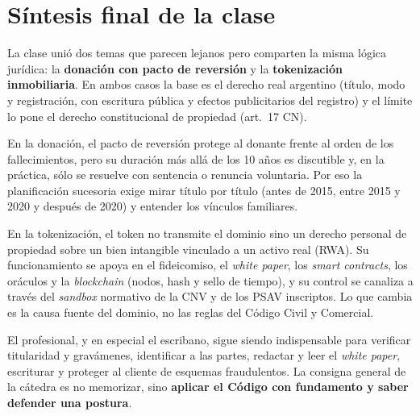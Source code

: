 \documentclass[12pt,oneside]{book}
\begin{document}
\chapter[Síntesis final]{Síntesis final de la clase}

La clase unió dos temas que parecen lejanos pero comparten la misma lógica jurídica: la \textbf{donación con pacto de reversión} y la \textbf{tokenización inmobiliaria}. En ambos casos la base es el derecho real argentino (título, modo y registración, con escritura pública y efectos publicitarios del registro) y el límite lo pone el derecho constitucional de propiedad (art.~17 CN).

En la donación, el pacto de reversión protege al donante frente al orden de los fallecimientos, pero su duración más allá de los 10 años es discutible y, en la práctica, sólo se resuelve con sentencia o renuncia voluntaria. Por eso la planificación sucesoria exige mirar título por título (antes de 2015, entre 2015 y 2020 y después de 2020) y entender los vínculos familiares.

En la tokenización, el token no transmite el dominio sino un derecho personal de propiedad sobre un bien intangible vinculado a un activo real (RWA). Su funcionamiento se apoya en el fideicomiso, el \textit{white paper}, los \textit{smart contracts}, los oráculos y la \textit{blockchain} (nodos, hash y sello de tiempo), y su control se canaliza a través del \textit{sandbox} normativo de la CNV y de los PSAV inscriptos. Lo que cambia es la causa fuente del dominio, no las reglas del Código Civil y Comercial.

El profesional, y en especial el escribano, sigue siendo indispensable para verificar titularidad y gravámenes, identificar a las partes, redactar y leer el \textit{white paper}, escriturar y proteger al cliente de esquemas fraudulentos. La consigna general de la cátedra es no memorizar, sino \textbf{aplicar el Código con fundamento y saber defender una postura}.
\end{document}
